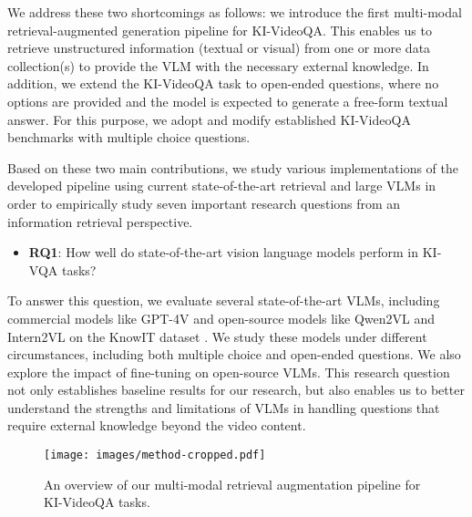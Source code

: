 We address these two shortcomings as follows: we introduce the first multi-modal retrieval-augmented generation pipeline for KI-VideoQA. This enables us to retrieve unstructured information (textual or visual) from one or more data collection(s) to provide the VLM with the necessary external knowledge. In addition, we extend the KI-VideoQA task to open-ended questions, where no options are provided and the model is expected to generate a free-form textual answer. For this purpose, we adopt and modify established KI-VideoQA benchmarks with multiple choice questions. %

Based on these two main contributions, we study various implementations of the developed pipeline using current state-of-the-art retrieval and large VLMs in order to empirically study seven important research questions from an information retrieval perspective.
\begin{itemize}[leftmargin=*]
    \item \textbf{RQ1}: How well do state-of-the-art vision language models perform in KI-VQA tasks? 
\end{itemize}
To answer this question, we evaluate several state-of-the-art VLMs, including commercial models like GPT-4V \cite{achiam2023gpt} and open-source models like Qwen2VL \cite{wang2024qwen2vl} and Intern2VL \cite{wang2024intern2vl} on the KnowIT dataset \cite{garcia2020knowit}. We study these models under different circumstances, including both multiple choice and open-ended questions. We also explore the impact of fine-tuning on open-source VLMs. This research question not only establishes baseline results for our research, but also enables us to better understand the strengths and limitations of VLMs in handling questions that require external knowledge beyond the video content. 

\begin{figure*}[ht]
  \centering
  \texttt{[image: images/method-cropped.pdf]}
  \caption{An overview of our multi-modal retrieval augmentation pipeline for KI-VideoQA tasks.}
  \label{fig:method_overview}
\end{figure*}

